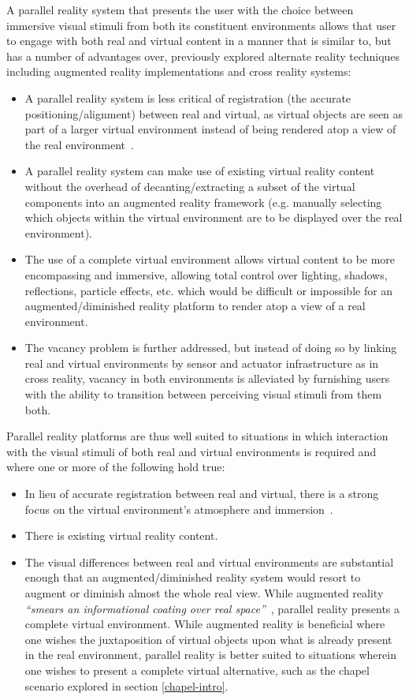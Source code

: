 A parallel reality system that presents the user with the choice between immersive visual stimuli from both its constituent environments allows that user to engage with both real and virtual content in a manner that is similar to, but has a number of advantages over, previously explored alternate reality techniques including augmented reality implementations and cross reality systems:

\begin{itemize}
	\item A parallel reality system is less critical of registration (the accurate positioning/alignment) between real and virtual, as virtual objects are seen as part of a larger virtual environment instead of being rendered atop a view of the real environment~\cite{Azuma1997}.
	\item A parallel reality system can make use of existing virtual reality content without the overhead of decanting/extracting a subset of the virtual components into an augmented reality framework (e.g. manually selecting which objects within the virtual environment are to be displayed over the real environment).
	\item The use of a complete virtual environment allows virtual content to be more encompassing and immersive, allowing total control over lighting, shadows, reflections, particle effects, etc. which would be difficult or impossible for an augmented/diminished reality platform to render atop a view of a real environment.
	\item The vacancy problem is further addressed, but instead of doing so by linking real and virtual environments by sensor and actuator infrastructure as in cross reality, vacancy in both environments is alleviated by furnishing users with the ability to transition between perceiving visual stimuli from them both.
\end{itemize}

Parallel reality platforms are thus well suited to situations in which interaction with the visual stimuli of both real and virtual environments is required and where one or more of the following hold true:

\begin{itemize}
	\item In lieu of accurate registration between real and virtual, there is a strong focus on the virtual environment's atmosphere and immersion~\cite{deamicis:gamebased}.
	\item There is existing virtual reality content.
	\item The visual differences between real and virtual environments are substantial enough that an augmented/diminished reality system would resort to augment or diminish almost the whole real view. While augmented reality \textit{``smears an informational coating over real space''}~\cite{Andersen}, parallel reality presents a complete virtual environment. While augmented reality is beneficial where one wishes the juxtaposition of virtual objects upon what is already present in the real environment, parallel reality is better suited to situations wherein one wishes to present a complete virtual alternative, such as the chapel scenario explored in section \ref{chapel-intro}.
\end{itemize}

